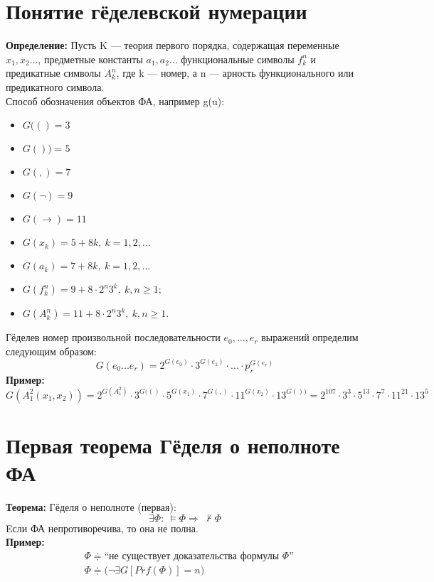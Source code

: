 \documentclass[../main.tex]{subfiles}
\begin{document}
\section{Понятие гёделевской нумерации}
\textbf{Определение:
} Пусть K — теория первого порядка, содержащая переменные $x_1,x_2 \ldots$, предметные константы $a_{1},a_{2} \ldots$ функциональные символы $f_{k}^{n}$ и предикатные символы $A_{k}^{n}$, где k — номер, а n — арность функционального или предикатного символа. \\
Способ обозначения объектов ФА, например g(u):
\begin{itemize}
	\item $G(() = 3$
	\item $G()) = 5$
	\item $G(,) = 7$
	\item $G(\lnot) = 9$
	\item $G(\to) = 11$
	\item $G(x_{k})=5+8k,\ k=1,2,\ldots $
	\item $G(a_{k})=7+8k,\ k=1,2,\ldots $
	\item $G(f_{k}^{n})=9+8\cdot 2^{n}3^{k},\ k,n\geqslant 1;$
	\item $G(A_{k}^{n})=11+8\cdot 2^{n}3^{k},\ k,n\geqslant 1.$
\end{itemize}
Гёделев номер произвольной последовательности $e_{0},\ldots ,e_{r}$ выражений определим следующим образом: 
\[G(e_{0}\ldots e_{r})=2^{{G(e_{0})}}\cdot 3^{{G(e_{1})}}\cdot \ldots \cdot p_{r}^{{G(e_{r})}}\]
\textbf{Пример:
}
\[G(A_{1}^{2}(x_{1},x_{2}))=2^{{G(A_{1}^{2})}}\cdot 3^{{G(()}}\cdot 5^{{G(x_{1})}}\cdot 7^{{G(,)}}\cdot 11^{{G(x_{2})}}\cdot 13^{{G())}}=2^{{107}}\cdot 3^{{3}}\cdot 5^{{13}}\cdot 7^{{7}}\cdot 11^{{21}}\cdot 13^{{5}}\]

\section{Первая теорема Гёделя о неполноте ФА}
\textbf{Теорема:
} Гёделя о неполноте (первая): \[\exists \Phi: \ \vDash \Phi \Rightarrow \ \nvdash \Phi \]
Eсли ФА непротиворечива, то она не полна. \\
\textbf{Пример:
} 
\begin{align*}
	&\Phi \doteqdot \textit{``не существует доказательства формулы $\Phi$''} \\ 
	&\Phi \doteqdot \bigl( \lnot \exists G\left[ Prf(\Phi)\right] = n \bigr)
\end{align*}
\end{document}
